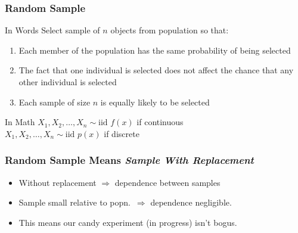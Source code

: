 \begin{frame}
\frametitle{Random Sample}

\begin{block}{In Words}
Select sample of $n$ objects from  population so that:
	\begin{enumerate}
\item Each member of the population has the same probability of being selected 
\item The fact that one individual is selected does not affect the chance that any other individual is selected
\item Each sample of size $n$ is equally likely to be selected

\end{enumerate}
\end{block}

\begin{alertblock}{In Math}
	$X_1, X_2, \hdots, X_n \sim \mbox{iid } f(x)$ if continuous\\
  $X_1, X_2, \hdots, X_n \sim \mbox{iid } p(x)$ if discrete
\end{alertblock}

\end{frame}

\begin{frame}
  \frametitle{Random Sample Means \emph{Sample With Replacement}}


\begin{itemize}
  \item Without replacement $\Rightarrow$ dependence between samples
  \item Sample small relative to popn.\ $\Rightarrow$ dependence negligible.
  \item This means our candy experiment (in progress) isn't bogus.
\end{itemize}
\end{frame}


